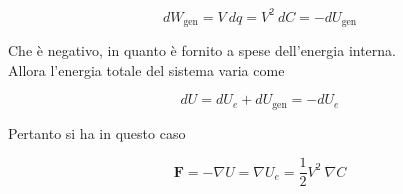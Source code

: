 \begin{equation}
    dW_{\text{gen}} = V \ dq = V^2 \ dC = - dU_{\text{gen}} 
\end{equation}

Che è negativo, in quanto è fornito a spese dell'energia interna.\\

Allora l'energia totale del sistema varia come 

\begin{equation}
    dU = dU_e + dU_{\text{gen}} = - dU_e
\end{equation}

Pertanto si ha in questo caso 

\begin{tcolorbox}[colback=yellow!10!white, colframe=orange!70!black, boxrule=0.8pt]
\begin{equation}
    \mathbf{F} = - \nabla U  = \nabla U_e = \frac{1}{2} V^2 \ \nabla C
\end{equation}
\end{tcolorbox}
